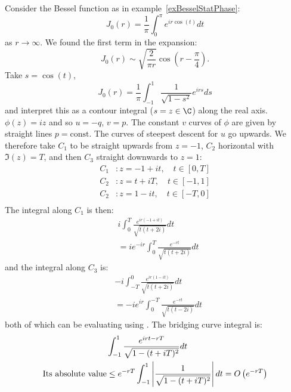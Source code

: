 \documentclass[../Main.tex]{subfiles}
\begin{document}
\begin{example}
    Consider the Bessel function as in example~\ref{exBesselStatPhase}:
    \begin{equation*}
        J_0(r) = \frac1\pi \int_{0}^{\pi} e^{ir\cos(t)} dt
    \end{equation*}
    as $r \to \infty$. We found the first term in the expansion:
    \begin{equation*}
        J_0(r) \sim \sqrt{\frac{2}{\pi r}} \cos\left(r - \frac\pi4\right).
    \end{equation*}
    Take $s = \cos(t)$,
    \begin{equation*}
        J_0(r) = \frac1\pi \int_{-1}^{1} \frac{1}{\sqrt{1 - s^2}} e^{irs} ds
    \end{equation*}
    and interpret this as a contour integral ($s = z \in \C$) along the real axis. $\phi(z) = iz$ and so $u = -q$, $v = p$. The constant $v$ curves of $\phi$ are given by straight lines $p = \text{const}$. The curves of steepest descent for $u$ go upwards. We therefore take $C_1$ to be straight upwards from $z = -1$, $C_2$ horizontal with $\Im(z) = T$, and then $C_3$ straight downwards to $z = 1$:
    \begin{align*}
        C_1&: z = -1 + it,\quad t \in [0, T] \\
        C_2&: z = t + iT,\quad t \in [-1, 1] \\
        C_2&: z = 1 - it,\quad t \in [-T, 0] \\
    \end{align*}
    The integral along $C_1$ is then:
    \begin{align*}
        &i \int_{0}^{T} \frac{e^{ir(-1+it)}}{\sqrt{t(t+2i)}} dt \\
        &= ie^{-ir} \int_{0}^{T} \frac{e^{-rt}}{\sqrt{t(t+2i)}} dt
    \end{align*}
    and the integral along $C_3$ is:
    \begin{align*}
        &-i \int_{-T}^{0} \frac{e^{ir(1-it)}}{\sqrt{t(t+2i)}} dt \\
        &= -ie^{ir} \int_{0}^{-T} \frac{e^{-rt}}{\sqrt{t(t-2i)}} dt
    \end{align*}
    both of which can be evaluating using . The bridging curve integral is:
    \begin{align*}
        &\int_{-1}^{1} \frac{e^{irt - rT}}{\sqrt{1-(t + iT)^2}} dt \\
        \text{Its absolute value} &\leq e^{-rT} \int_{-1}^{1} \abs{\frac{1}{\sqrt{1 - (t + iT)^2}}} dt = O\left(e^{-rT}\right)

\end{align*}
\end{example}
\end{document}
